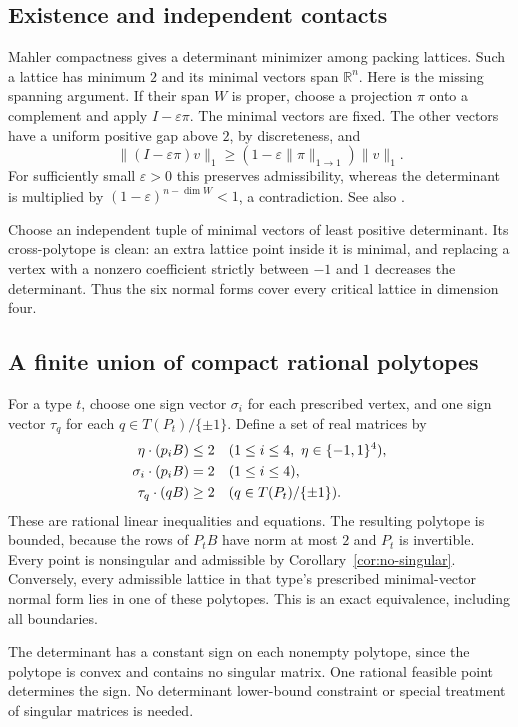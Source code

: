 \documentclass[11pt,reqno]{amsart}
\theoremstyle{definition}
\newcommand{\R}{\mathbb R}
\newcommand{\norm}[1]{\lVert #1\rVert_1}
\begin{document}
\subsection{Existence and independent contacts}
Mahler compactness gives a determinant minimizer among packing
lattices. Such a lattice has minimum $2$ and its minimal vectors span
$\R^n$. Here is the missing spanning argument. If their span $W$ is
proper, choose a projection $\pi$ onto a complement and apply
$I-\varepsilon\pi$. The minimal vectors are fixed. The other vectors
have a uniform positive gap above $2$, by discreteness, and
\[
 \norm{(I-\varepsilon\pi)v}
 \ge (1-\varepsilon\|\pi\|_{1\to1})\norm{v}.
\]
For sufficiently small $\varepsilon>0$ this preserves admissibility,
whereas the determinant is multiplied by
$(1-\varepsilon)^{n-\dim W}<1$, a contradiction. See also
\cite[Proposition 4]{Miller}.

Choose an independent tuple of minimal vectors of least positive
determinant. Its cross-polytope is clean: an extra lattice point
inside it is minimal, and replacing a vertex with a nonzero coefficient
strictly between $-1$ and $1$ decreases the determinant. Thus the six
normal forms cover every critical lattice in dimension four.

\subsection{A finite union of compact rational polytopes}
For a type $t$, choose one sign vector $\sigma_i$ for each prescribed
vertex, and one sign vector $\tau_q$ for each $q\in T(P_t)/\{\pm1\}$.
Define a set of real matrices by
\begin{align}\label{eq:polytope}
 \eta\cdot(p_iB)&\le2
       &&(1\le i\le4,\ \eta\in\{-1,1\}^4),\notag\\
 \sigma_i\cdot(p_iB)&=2
       &&(1\le i\le4),\\
 \tau_q\cdot(qB)&\ge2
       &&(q\in T(P_t)/\{\pm1\}).\notag
\end{align}
These are rational linear inequalities and equations. The resulting
polytope is bounded, because the rows of $P_tB$ have norm at most $2$
and $P_t$ is invertible. Every point is nonsingular and admissible by
Corollary~\ref{cor:no-singular}. Conversely, every admissible lattice
in that type's prescribed minimal-vector normal form lies in one of
these polytopes. This is an exact equivalence, including all boundaries.

The determinant has a constant sign on each nonempty polytope, since
the polytope is convex and contains no singular matrix. One rational
feasible point determines the sign. No determinant lower-bound
constraint or special treatment of singular matrices is needed.
\end{document}
